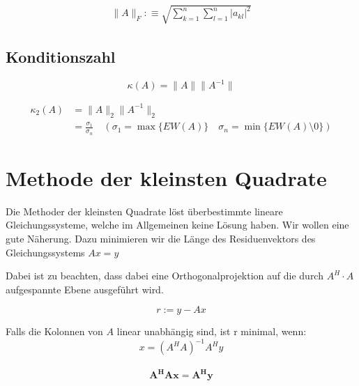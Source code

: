 \documentclass[a4paper,twocolumn]{article}
\begin{document}
		\begin{fdef}[Frobeniusnorm]
			\begin{align*}
				\| A \|_F :\equiv \sqrt{\sum_{k=1}^n \sum_{l=1}^n | a_{kl} |^2}
			\end{align*}

		\end{fdef}
	\subsection{Konditionszahl}
		\begin{fdef}[Konditionszahl]
			$$\kappa( A ) = \| A \| \| A^{-1} \|$$
		\end{fdef}
		
		\begin{fdef}
			\begin{align*}
				\kappa_2(A) &= \| A \|_2 \| A^{-1} \|_2 \\
							&= \frac{\sigma_1}{\sigma_n} \quad \left( \sigma_1=\max \{EW(A) \} \quad \sigma_n = \min \{ EW(A) \setminus 0 \} \right)
			\end{align*}
		\end{fdef}


\section{Methode der kleinsten Quadrate}
	Die Methoder der kleinsten Quadrate löst überbestimmte lineare Gleichungssysteme, welche im Allgemeinen keine Lösung haben. Wir
	wollen eine gute Näherung. Dazu minimieren wir die Länge des Residuenvektors des Gleichungssystems $A x = y$
	
	Dabei ist zu beachten, dass dabei eine Orthogonalprojektion auf die durch $A^H\cdot A$ aufgespannte Ebene ausgeführt wird.
	\begin{fdef}[Residuenvektor]
		$$r := y - Ax$$
		\vspace{-5mm}
	\end{fdef} 
	
	\begin{fdef}[Normalengleichung]
		Falls die Kolonnen von $A$ linear unabhängig sind, ist r minimal, wenn:
		$$x = (A^HA)^{-1}A^Hy$$\\[-9mm]
		$$\mathbf{A^HAx = A^Hy}$$
	\end{fdef}
	\vspace{-2mm}
		
\end{document}

